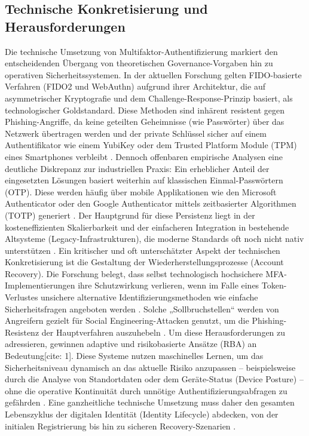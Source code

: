 \subsection{Technische Konkretisierung und Herausforderungen}
Die technische Umsetzung von Multifaktor-Authentifizierung markiert den entscheidenden Übergang von theoretischen Governance-Vorgaben hin zu operativen Sicherheitssystemen. In der aktuellen Forschung gelten FIDO-basierte Verfahren (FIDO2 und WebAuthn) aufgrund ihrer Architektur, die auf asymmetrischer Kryptografie und dem {Challenge-Response}-Prinzip basiert, als technologischer Goldstandard. Diese Methoden sind inhärent resistent gegen Phishing-Angriffe, da keine geteilten Geheimnisse (wie Passwörter) über das Netzwerk übertragen werden und der private Schlüssel sicher auf einem Authentifikator wie einem YubiKey oder dem {Trusted Platform Module} (TPM) eines Smartphones verbleibt \cite[S. 269, 422]{1}.
Dennoch offenbaren empirische Analysen eine deutliche Diskrepanz zur industriellen Praxis: Ein erheblicher Anteil der eingesetzten Lösungen basiert weiterhin auf klassischen Einmal-Passwörtern (OTP). Diese werden häufig über mobile Applikationen wie den {Microsoft Authenticator} oder den {Google Authenticator} mittels zeitbasierter Algorithmen (TOTP) generiert \cite[S. 5, 13]{1}. Der Hauptgrund für diese Persistenz liegt in der kosteneffizienten Skalierbarkeit und der einfacheren Integration in bestehende Altsysteme ({Legacy-Infrastrukturen}), die moderne Standards oft noch nicht nativ unterstützen \cite[S. 2--3]{1}.
Ein kritischer und oft unterschätzter Aspekt der technischen Konkretisierung ist die Gestaltung der Wiederherstellungsprozesse ({Account Recovery}). Die Forschung belegt, dass selbst technologisch hochsichere MFA-Implementierungen ihre Schutzwirkung verlieren, wenn im Falle eines Token-Verlustes unsichere alternative Identifizierungsmethoden wie einfache Sicherheitsfragen angeboten werden \cite[S. 3822]{1}. Solche „Sollbruchstellen“ werden von Angreifern gezielt für {Social Engineering}-Attacken genutzt, um die Phishing-Resistenz der Hauptverfahren auszuhebeln \cite[S. 3822]{1}. 
Um diese Herausforderungen zu adressieren, gewinnen adaptive und risikobasierte Ansätze (RBA) an Bedeutung[cite: 1]. Diese Systeme nutzen maschinelles Lernen, um das Sicherheitsniveau dynamisch an das aktuelle Risiko anzupassen – beispielsweise durch die Analyse von Standortdaten oder dem Geräte-Status ({Device Posture}) – ohne die operative Kontinuität durch unnötige Authentifizierungsabfragen zu gefährden \cite[S. 11, 140, 177]{1}. Eine ganzheitliche technische Umsetzung muss daher den gesamten Lebenszyklus der digitalen Identität ({Identity Lifecycle}) abdecken, von der initialen Registrierung bis hin zu sicheren Recovery-Szenarien \cite[S. 42]{1}.

